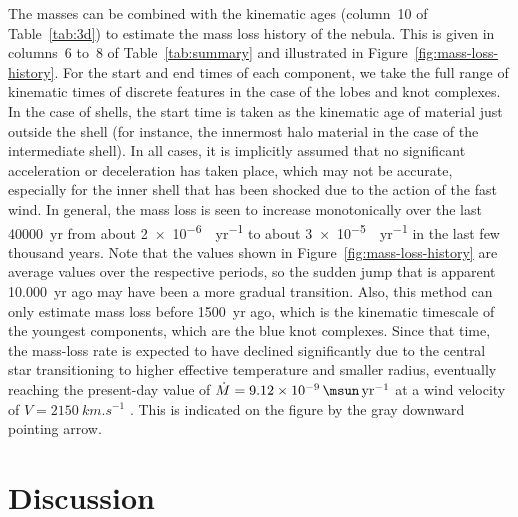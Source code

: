 \documentclass[useAMS, usenatbib]{mnras}
\begin{document}
The masses can be combined with the kinematic ages (column~10 of Table~\ref{tab:3d}) to estimate the mass loss history of the nebula.
This is given in columns~6 to~8 of Table~\ref{tab:summary} and illustrated in Figure~\ref{fig:mass-loss-history}.
For the start and end times of each component, we take the full range of kinematic times of discrete features in the case of the lobes and knot complexes.
In the case of shells, the start time is taken as the kinematic age of material just outside the shell (for instance, the innermost halo material in the case of the intermediate shell).
In all cases, it is implicitly assumed that no significant acceleration or deceleration has taken place,
which may not be accurate, especially for the inner shell that has been shocked due to the action of the fast wind.
In general, the mass loss is seen to increase monotonically over the last \SI{40000}{yr} from about \SI{2e-6}{\msun.yr^{-1}} to about \SI{3e-5}{\msun.yr^{-1}} in the last few thousand years.
Note that the values shown in Figure~\ref{fig:mass-loss-history} are average values over the respective periods,
so the sudden jump that is apparent \SI{10,000}{yr} ago may have been a more gradual transition.
Also, this method can only estimate mass loss before \SI{1500}{yr} ago, which is the kinematic timescale of the youngest components,
which are the blue knot complexes.
Since that time, the mass-loss rate is expected to have declined significantly
due to the central star transitioning to higher effective temperature and smaller radius,
eventually reaching the present-day value of \(\dot{M} = \SI{9.12e-9}{\msun.yr^{-1}}\) at a wind velocity of \(V = \SI{2150}{km.s^{-1}}\) \citep{Herald:2011a}.
This is indicated on the figure by the gray downward pointing arrow.




\section{Discussion}
\label{sec:discussion}
\end{document}
